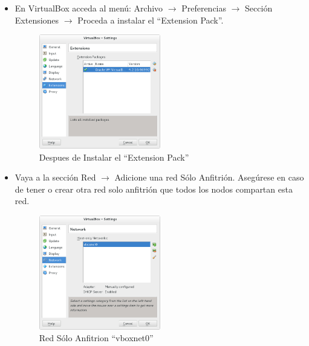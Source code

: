 \begin{enumerate}
	
\begin{itemize}


	\item En VirtualBox acceda al menú: Archivo $\rightarrow$ Preferencias $\rightarrow$ Sección Extensiones $\rightarrow$ Proceda a instalar el ``Extension Pack''. 
	
	\begin{figure}[H]
		\centering
		\includegraphics[width=0.5\textwidth]{aux/conextensionpack}
		\caption{Despues de Instalar el ``Extension Pack''}
	\end{figure}
	

	\item Vaya a la sección Red $\rightarrow$ Adicione una red Sólo Anfitrión. Asegúrese en caso de tener o crear otra red solo anfitrión que todos los nodos compartan esta red.


	
	\begin{figure}[H]
		\centering
		\includegraphics[width=0.5\textwidth]{aux/hostonly}
		\caption{Red Sólo Anfitrion ``vboxnet0''}
	\end{figure}
	
	


\end{itemize}
\end{enumerate}

